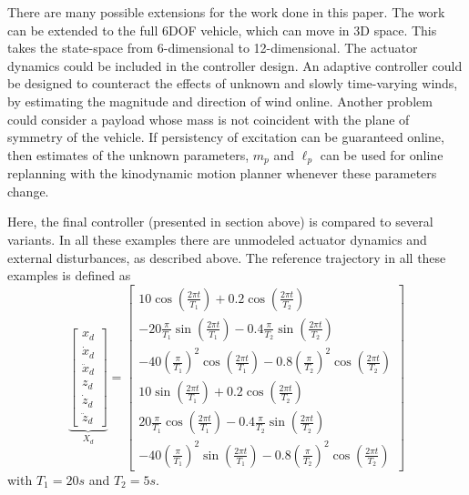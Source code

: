 \documentclass[letterpaper, 10 pt, conference]{ieeeconf}\usepackage[margin=1in]{geometry}
\begin{document}
There are many possible extensions for the work done in this paper. The work can be extended to the full 6DOF vehicle, which can move in 3D space. This takes the state-space from 6-dimensional to 12-dimensional. The actuator dynamics could be included in the controller design. An adaptive controller could be designed to counteract the effects of unknown and slowly time-varying winds, by estimating the magnitude and direction of wind online. Another problem could consider a payload whose mass is not coincident with the plane of symmetry of the vehicle. If persistency of excitation can be guaranteed online, then estimates of the unknown parameters, $m_p$ and $\ell_p$ can be used for online replanning with the kinodynamic motion planner whenever these parameters change.


\nocite{slotine1991applied, karaman2010optimal, webb2013kinodynamic, allen2015toward, bouabdallah2007full}



\newpage
\appendix
Here, the final controller (presented in section above) is compared to several variants. In all these examples there are unmodeled actuator dynamics and external disturbances, as described above. The reference trajectory in all these examples is defined as
\begin{equation}
	\underbrace{\begin{bmatrix}
		x_d \\ \dot{x}_d \\ \ddot{x}_d \\ z_d \\ \dot{z}_d \\ \ddot{z}_d
	\end{bmatrix}}_{X_d} = \begin{bmatrix}
		10 \cos(\frac{2 \pi t}{T_1}) + 0.2 \cos(\frac{2 \pi t}{T_2}) \\
		-20 \frac{\pi}{T_1} \sin(\frac{2 \pi t}{T_1}) - 0.4 \frac{\pi}{T_2} \sin(\frac{2 \pi t}{T_2}) \\
		-40 (\frac{\pi}{T_1})^2 \cos(\frac{2 \pi t}{T_1}) - 0.8 (\frac{\pi}{T_2})^2 \cos(\frac{2 \pi t}{T_2}) \\
		10 \sin(\frac{2 \pi t}{T_1}) + 0.2 \cos(\frac{2 \pi t}{T_2}) \\
		20 \frac{\pi}{T_1} \cos(\frac{2 \pi t}{T_1}) - 0.4 \frac{\pi}{T_2} \sin(\frac{2 \pi t}{T_2}) \\
		-40 (\frac{\pi}{T_1})^2 \sin(\frac{2 \pi t}{T_1}) - 0.8 (\frac{\pi}{T_2})^2 \cos(\frac{2 \pi t}{T_2})
	\end{bmatrix}
\end{equation} with $T_1 = 20s$ and $T_2 = 5s$.
\end{document}
